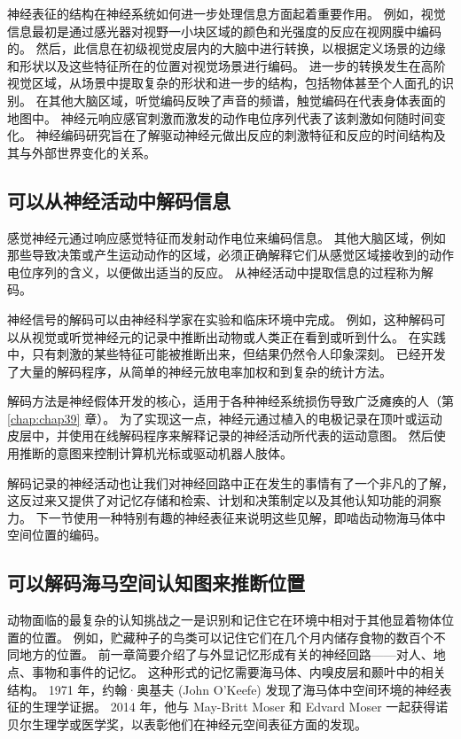 神经表征的结构在神经系统如何进一步处理信息方面起着重要作用。 
例如，视觉信息最初是通过感光器对视野一小块区域的颜色和光强度的反应在视网膜中编码的。 
然后，此信息在初级视觉皮层内的大脑中进行转换，以根据定义场景的边缘和形状以及这些特征所在的位置对视觉场景进行编码。 
进一步的转换发生在高阶视觉区域，从场景中提取复杂的形状和进一步的结构，包括物体甚至个人面孔的识别。 
在其他大脑区域，听觉编码反映了声音的频谱，触觉编码在代表身体表面的地图中。
神经元响应感官刺激而激发的动作电位序列代表了该刺激如何随时间变化。 
神经编码研究旨在了解驱动神经元做出反应的刺激特征和反应的时间结构及其与外部世界变化的关系。


\subsection{可以从神经活动中解码信息}
感觉神经元通过响应感觉特征而发射动作电位来编码信息。 
其他大脑区域，例如那些导致决策或产生运动动作的区域，必须正确解释它们从感觉区域接收到的动作电位序列的含义，以便做出适当的反应。 
从神经活动中提取信息的过程称为解码。


神经信号的解码可以由神经科学家在实验和临床环境中完成。 
例如，这种解码可以从视觉或听觉神经元的记录中推断出动物或人类正在看到或听到什么。 
在实践中，只有刺激的某些特征可能被推断出来，但结果仍然令人印象深刻。 
已经开发了大量的解码程序，从简单的神经元放电率加权和到复杂的统计方法。


解码方法是神经假体开发的核心，适用于各种神经系统损伤导致广泛瘫痪的人（第\ref{chap:chap39} 章）。 
为了实现这一点，神经元通过植入的电极记录在顶叶或运动皮层中，并使用在线解码程序来解释记录的神经活动所代表的运动意图。 
然后使用推断的意图来控制计算机光标或驱动机器人肢体。


解码记录的神经活动也让我们对神经回路中正在发生的事情有了一个非凡的了解，这反过来又提供了对记忆存储和检索、计划和决策制定以及其他认知功能的洞察力。 
下一节使用一种特别有趣的神经表征来说明这些见解，即啮齿动物海马体中空间位置的编码。


\subsection{可以解码海马空间认知图来推断位置}
动物面临的最复杂的认知挑战之一是识别和记住它在环境中相对于其他显着物体位置的位置。 
例如，贮藏种子的鸟类可以记住它们在几个月内储存食物的数百个不同地方的位置。
前一章简要介绍了与外显记忆形成有关的神经回路——对人、地点、事物和事件的记忆。
这种形式的记忆需要海马体、内嗅皮层和颞叶中的相关结构。 
1971 年，约翰·奥基夫 (John O’Keefe) 发现了海马体中空间环境的神经表征的生理学证据。 
2014 年，他与 May-Britt Moser 和 Edvard Moser 一起获得诺贝尔生理学或医学奖，以表彰他们在神经元空间表征方面的发现。


